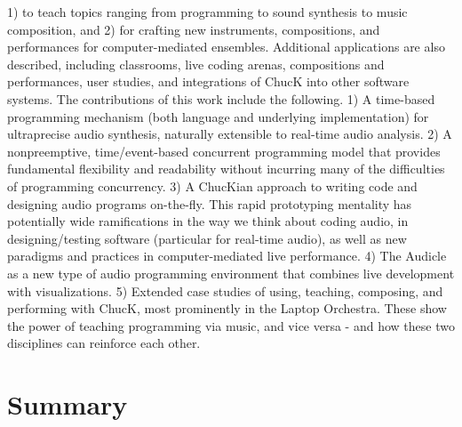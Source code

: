 1) to teach topics ranging from programming to sound synthesis to music composition, 
and 2) for crafting new instruments, compositions, and performances for
computer-mediated ensembles. Additional applications are also described, including 
classrooms, live coding arenas, compositions and performances, user studies,
and integrations of ChucK into other software systems.
The contributions of this work include the following. 1) A time-based programming 
mechanism (both language and underlying implementation) for ultraprecise audio 
synthesis, naturally extensible to real-time audio analysis. 2) A nonpreemptive, 
time/event-based concurrent programming model that provides fundamental flexibility 
and readability without incurring many of the difficulties of
programming concurrency. 3) A ChucKian approach to writing code and designing audio 
programs on-the-fly. This rapid prototyping mentality has potentially
wide ramifications in the way we think about coding audio, in designing/testing
software (particular for real-time audio), as well as new paradigms and practices
in computer-mediated live performance. 4) The Audicle as a new type of audio
programming environment that combines live development with visualizations. 5)
Extended case studies of using, teaching, composing, and performing with ChucK,
most prominently in the Laptop Orchestra. These show the power of teaching programming 
via music, and vice versa - and how these two disciplines can reinforce
each other.


\section{Summary}


